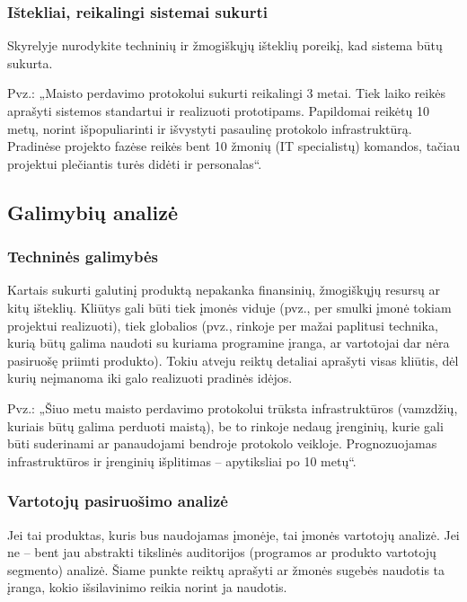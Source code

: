 \documentclass{ktuthesis}
\begin{document}
  \subsubsection{Ištekliai, reikalingi sistemai sukurti}

  Skyrelyje nurodykite techninių ir žmogiškųjų išteklių poreikį, kad sistema būtų sukurta.

  Pvz.: „Maisto perdavimo protokolui sukurti reikalingi 3 metai. Tiek laiko reikės aprašyti sistemos standartui ir realizuoti prototipams. Papildomai reikėtų
  10 metų, norint išpopuliarinti ir išvystyti pasaulinę protokolo infrastruktūrą. Pradinėse projekto fazėse reikės bent 10 žmonių (IT specialistų) komandos,
  tačiau projektui plečiantis turės didėti ir personalas“.

  \subsection{Galimybių analizė}

  \subsubsection{Techninės galimybės}
  Kartais sukurti galutinį produktą nepakanka finansinių, žmogiškųjų resursų ar kitų išteklių. Kliūtys gali būti tiek įmonės viduje (pvz., per smulki įmonė
  tokiam projektui realizuoti), tiek globalios (pvz., rinkoje per mažai paplitusi technika, kurią būtų galima naudoti su kuriama programine įranga, ar vartotojai
  dar nėra pasiruošę priimti produkto). Tokiu atveju reiktų detaliai aprašyti visas kliūtis, dėl kurių neįmanoma iki galo realizuoti pradinės idėjos.

  Pvz.: „Šiuo metu maisto perdavimo protokolui trūksta infrastruktūros (vamzdžių, kuriais būtų galima perduoti maistą), be to rinkoje nedaug įrenginių, kurie gali
  būti suderinami ar panaudojami bendroje protokolo veikloje. Prognozuojamas infrastruktūros ir įrenginių išplitimas – apytiksliai po 10 metų“.

  \subsubsection{Vartotojų pasiruošimo analizė}
  Jei tai produktas, kuris bus naudojamas įmonėje, tai įmonės vartotojų analizė. Jei ne – bent jau abstrakti tikslinės auditorijos (programos ar produkto vartotojų
  segmento) analizė. Šiame punkte reiktų aprašyti ar žmonės sugebės naudotis ta įranga, kokio išsilavinimo reikia norint ja naudotis.
\end{document}
